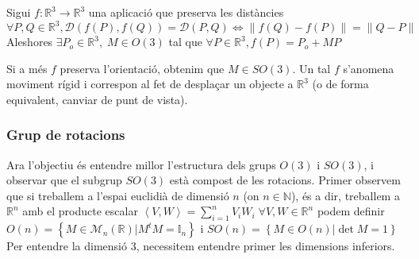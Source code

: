 \documentclass[../main.tex]{subfiles}
\begin{document}
	\begin{teorema}
	    Sigui $f: \mathbb{R}^3 \to \mathbb{R}^3$ una aplicació que preserva les distàncies $\forall P, Q \in \mathbb{R}^3, \mathcal{D}\left(f(P), f(Q)\right) = \mathcal{D}(P, Q) \Leftrightarrow \left\lVert f(Q)-f(P)\right\rVert = \left\lVert Q-P\right\rVert$
	    Aleshores $\exists P_o \in \mathbb{R}^3,\; M \in O(3)$ tal que $\forall P \in \mathbb{R}^3, f(P) = P_o + MP$
	\end{teorema}

	\begin{definicio}
	    Si a més $f$ preserva l'orientació, obtenim que $M \in SO(3)$.
	    Un tal $f$ s'anomena moviment rígid i correspon al fet de desplaçar un objecte a $\mathbb{R}^3$
	    (o de forma equivalent, canviar de punt de vista).
	\end{definicio}

	\subsubsection{Grup de rotacions}

	Ara l'objectiu és entendre millor l'estructura dels grups $O(3)$ i $SO(3)$, i observar que el
	subgrup $SO(3)$ està compost de les rotacions.
	Primer observem que si treballem a l'espai euclidià de dimensió $n$ (on $n \in \mathbb{N}$), és a
	dir, treballem a $\mathbb{R}^n$ amb el producte escalar $\left\langle V, W\right\rangle = \sum\limits_{i = 1}^{n} V_i W_i\; \forall V, W \in \mathbb{R}^n$
	podem definir $O(n) = \left\{M \in \mathcal{M}_n(\mathbb{R}) | M^tM = \mathbb{I}_n\right\}$ i $SO(n) = \left\{M \in O(n) | \det{M} = 1\right\}$\\
	Per entendre la dimensió $3$, necessitem entendre primer les dimensions inferiors.
\end{document}
